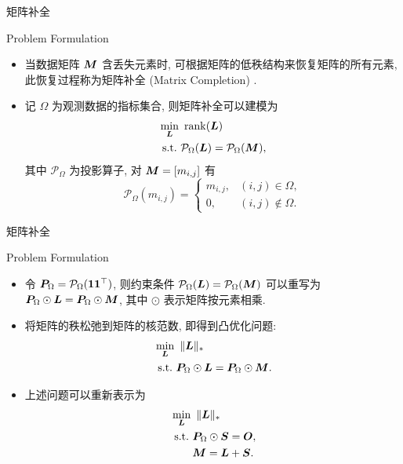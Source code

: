 \documentclass{beamer}
\begin{document}
\begin{frame}{矩阵补全}
  \begin{block}{Problem Formulation}
    \begin{itemize}
      \item 当数据矩阵 $\bm{M}$ 含丢失元素时, 可根据矩阵的低秩结构来恢复矩阵的所有元素, 此恢复过程称为矩阵补全 (Matrix Completion) \cite{candes2012exact}.
      \item 记 $\Omega$ 为观测数据的指标集合, 则矩阵补全可以建模为
      \begin{equation}
        \begin{aligned}
          &\min_{\bm{L}}~\operatorname{rank}(\bm{L}) \\
          &~\text{s.t.}~\mathcal{P}_\Omega(\bm{L})=\mathcal{P}_\Omega(\bm{M}),\\
        \end{aligned}
      \end{equation}
      其中 $\mathcal{P}_\Omega$ 为投影算子, 对 $\bm{M}=[m_{i,j}]$ 有
      \begin{equation}
        \mathcal{P}_\Omega(m_{i,j})=\begin{cases}
          m_{i,j}, & (i,j)\in\Omega, \\
          0, & (i,j)\notin\Omega.
        \end{cases}
      \end{equation}
    \end{itemize}
  \end{block}
\end{frame}

\begin{frame}{矩阵补全}
  \begin{block}{Problem Formulation}
    \begin{itemize}
      \item 令 $\bm{P}_\Omega=\mathcal{P}_\Omega(\bm{1}\bm{1}^\top)$, 则约束条件 $\mathcal{P}_\Omega(\bm{L})=\mathcal{P}_\Omega(\bm{M})$ 可以重写为 $\bm{P}_\Omega\odot\bm{L}=\bm{P}_\Omega\odot\bm{M}$, 其中 $\odot$ 表示矩阵按元素相乘.
      \item 将矩阵的秩松弛到矩阵的核范数, 即得到凸优化问题:
      \begin{equation}
        \label{eq:matrix_completion_single}
        \begin{aligned}
          &\min_{\bm{L}}~\|\bm{L}\|_{*} \\
          &~\text{s.t.}~\bm{P}_\Omega\odot\bm{L}=\bm{P}_\Omega\odot\bm{M}.\\
        \end{aligned}
      \end{equation}
      \item 上述问题可以重新表示为
      \begin{equation}
        \label{eq:matrix_completion}
        \begin{aligned}
          &\min_{\bm{L}}~\|\bm{L}\|_{*} \\
          &~\text{s.t.}~\bm{P}_\Omega\odot\bm{S}=\bm{O},\\
          &\qquad \bm{M}=\bm{L}+\bm{S}.
        \end{aligned}
      \end{equation}
    \end{itemize}
  \end{block}
\end{frame}
\end{document}
